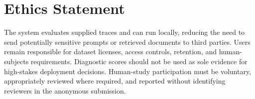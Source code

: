 \section{Ethics Statement}
The system evaluates supplied traces and can run locally, reducing the need to
send potentially sensitive prompts or retrieved documents to third parties.
Users remain responsible for dataset licenses, access controls, retention, and
human-subjects requirements. Diagnostic scores should not be used as sole
evidence for high-stakes deployment decisions. Human-study participation must
be voluntary, appropriately reviewed where required, and reported without
identifying reviewers in the anonymous submission.
